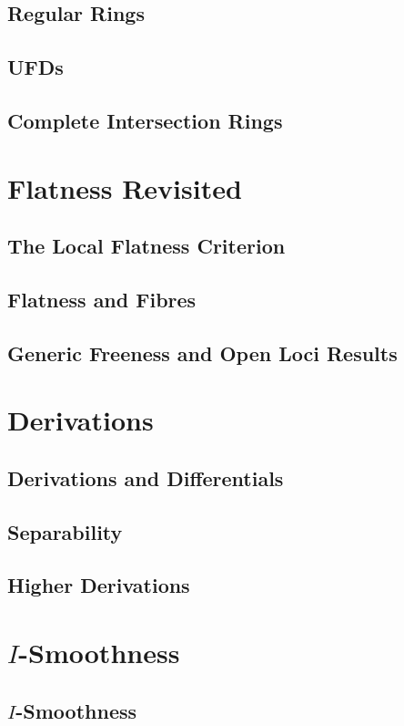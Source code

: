 \subsection{Regular Rings}
\subsection{UFDs}
\subsection{Complete Intersection Rings}

\section{Flatness Revisited}
\subsection{The Local Flatness Criterion}
\subsection{Flatness and Fibres}
\subsection{Generic Freeness and Open Loci Results}

\section{Derivations}
\subsection{Derivations and Differentials}
\subsection{Separability}
\subsection{Higher Derivations}

\section{$I$-Smoothness}
\subsection{$I$-Smoothness}
